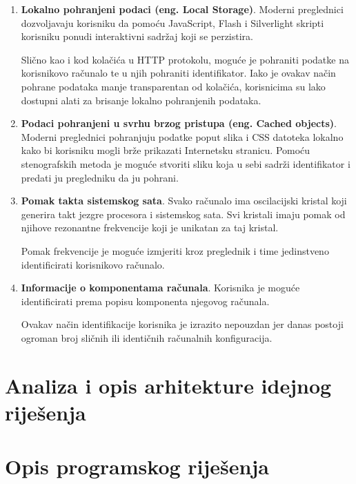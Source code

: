 \documentclass[times, utf8, zavrsni]{fer}
\begin{document}
\begin{enumerate}
  \item \textbf{Lokalno pohranjeni podaci (eng. Local Storage)}. Moderni
    preglednici dozvoljavaju korisniku da pomoću JavaScript, Flash i Silverlight
    skripti korisniku ponudi interaktivni sadržaj koji se perzistira.

    Slično kao i kod kolačića u HTTP protokolu, moguće je pohraniti podatke
    na korisnikovo računalo te u njih pohraniti identifikator. Iako je ovakav
    način pohrane podataka manje transparentan od kolačića, korisnicima su lako
    dostupni alati za brisanje lokalno pohranjenih podataka.

  \item \textbf{Podaci pohranjeni u svrhu brzog pristupa (eng. Cached objects)}.
    Moderni preglednici pohranjuju podatke poput slika i CSS datoteka lokalno
    kako bi korisniku mogli brže prikazati Internetsku stranicu. Pomoću
    stenografskih metoda je moguće stvoriti sliku koja u sebi sadrži
    identifikator i predati ju pregledniku da ju pohrani.

  \item \textbf{Pomak takta sistemskog sata}. Svako računalo ima oscilacijski
    kristal koji generira takt jezgre procesora i sistemskog sata. Svi
    kristali imaju pomak od njihove rezonantne frekvencije koji je unikatan za
    taj kristal.

    Pomak frekvencije je moguće izmjeriti kroz preglednik i time jedinstveno
    identificirati korisnikovo računalo.

  \item \textbf{Informacije o komponentama računala}. Korisnika je moguće
    identificirati prema popisu komponenta njegovog računala.

    Ovakav način identifikacije korisnika je izrazito nepouzdan jer danas
    postoji ogroman broj sličnih ili identičnih računalnih konfiguracija.

\end{enumerate}

\chapter{Analiza i opis arhitekture idejnog riješenja}

\chapter{Opis programskog riješenja}
\end{document}
